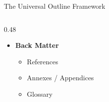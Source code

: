 \documentclass[xcolor={table,dvipsnames},aspectratio=169,11pt]{beamer}
\begin{document}
\begin{frame}{The Universal Outline Framework}
\begin{columns}[t]
\begin{column}{0.48\textwidth}
\begin{itemize}
\begin{itemize}
            \end{itemize}
            \vskip 0.1cm
            \item[\textbf{5.}] \textbf{Back Matter}
            \begin{itemize}
                \item References
                \item Annexes / Appendices
                \item Glossary
            \end{itemize}
        \end{itemize}
    \end{column}
    \end{columns}
\end{frame}

\end{document}
